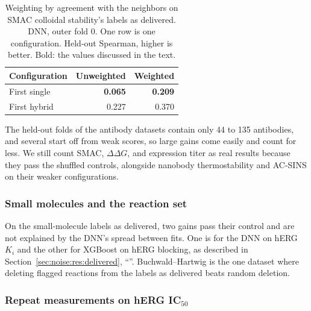 \begin{table}[htbp]
\centering
\begin{tabular}{@{}lrr@{}}
\toprule
Configuration & Unweighted & Weighted \\
\midrule
First single & \textbf{0.065} & \textbf{0.209} \\
First hybrid & 0.227 & 0.370 \\
\bottomrule
\end{tabular}
\caption[Neighbor-agreement weights on SMAC colloidal stability.]{Weighting by agreement with the neighbors on SMAC colloidal stability's labels as delivered. DNN, outer fold 0. One row is one configuration. Held-out Spearman, higher is better. Bold: the values discussed in the text.}
\label{tab:noise:res:smac_weights}
\end{table}

The held-out folds of the antibody datasets contain only 44 to 135 antibodies, and several start off from weak scores, so large gains come easily and count for less. We still count SMAC, $\Delta\Delta G$, and expression titer as real results because they pass the shuffled controls, alongside nanobody thermostability and AC-SINS on their weaker configurations.

\subsubsection{Small molecules and the reaction set}\label{sec:noise:res:smallmol}

On the small-molecule labels as delivered, two  gains pass their control and are not explained by the DNN's spread between fits. One is for the DNN on hERG $K_i$ and the other for XGBoost on hERG blocking, as described in Section~\ref{sec:noise:res:delivered}, ``''. Buchwald--Hartwig is the one dataset where deleting flagged reactions from the labels as delivered beats random deletion.

\subsubsection{Repeat measurements on hERG IC\texorpdfstring{$_{50}$}{50}}\label{sec:noise:res:herg_ic50}

